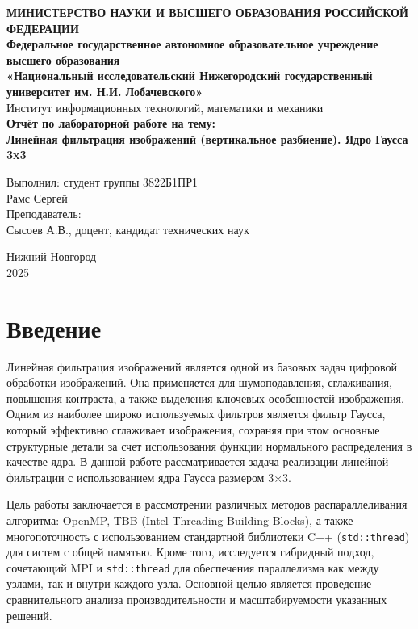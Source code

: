 \documentclass[12pt]{article}
\begin{document}
\begin{titlepage}
	\begin{center}
		\textbf{МИНИСТЕРСТВО НАУКИ И ВЫСШЕГО ОБРАЗОВАНИЯ РОССИЙСКОЙ ФЕДЕРАЦИИ} \\[0.5cm]
		\textbf{Федеральное государственное автономное образовательное учреждение высшего образования} \\[0.5cm]
		\textbf{«Национальный исследовательский Нижегородский государственный университет им. Н.И. Лобачевского»} \\[0.5cm]
		Институт информационных технологий, математики и механики \\
		\vfill
		{\Large
			\textbf{Отчёт по лабораторной работе на тему:} \\[0.5cm]
			\textbf{Линейная фильтрация изображений (вертикальное разбиение). Ядро Гаусса 3x3} \\
		}
		\vfill
		\begin{flushright}
			Выполнил: студент группы 3822Б1ПР1 \\
			Рамс Сергей \\
			\vspace{1cm}
			Преподаватель: \\
			Сысоев А.В., доцент, кандидат технических наук \\
		\end{flushright}
		\vfill
		Нижний Новгород \\
		2025
	\end{center}
\end{titlepage}

\tableofcontents
\newpage

\section{Введение}

Линейная фильтрация изображений является одной из базовых задач цифровой обработки изображений. Она применяется для шумоподавления, сглаживания, повышения контраста, а также выделения ключевых особенностей изображения.
Одним из наиболее широко используемых фильтров является фильтр Гаусса, который эффективно сглаживает изображения, сохраняя при этом основные структурные детали за счет использования функции нормального распределения в качестве ядра. 
В данной работе рассматривается задача реализации линейной фильтрации с использованием ядра Гаусса размером 3×3.


Цель работы заключается в рассмотрении различных методов распараллеливания алгоритма: OpenMP, TBB (Intel Threading Building Blocks), а также многопоточность с использованием стандартной библиотеки C++ (\texttt{std::thread}) для систем с общей памятью.
Кроме того, исследуется гибридный подход, сочетающий MPI и \texttt{std::thread} для обеспечения параллелизма как между узлами, так и внутри каждого узла.
Основной целью является проведение сравнительного анализа производительности и масштабируемости указанных решений.
\end{document}
